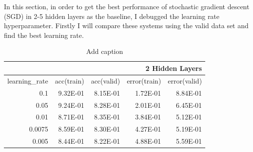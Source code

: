 \documentclass{article}
\begin{document}
In this section, in order to get the best performance of stochastic gradient descent (SGD) in 2-5 hidden layers as the baseline, I debugged the learning rate hyperparameter. Firstly I will compare these systems using the valid data set and find the best learning rate.
\begin{table}[htbp]
  \centering
  \caption{Add caption}
    \begin{tabular}{|r|r|r|r|r|}
    \toprule
    \multicolumn{5}{|p{25em}|}{2 Hidden Layers} \\
    \midrule
    \multicolumn{1}{|r|}{\multirow{2}[2]{*}{learning\_rate}} & \multicolumn{1}{r|}{\multirow{2}[2]{*}{acc(train)}} & \multicolumn{1}{r|}{\multirow{2}[2]{*}{acc(valid)}} & \multicolumn{1}{r|}{\multirow{2}[2]{*}{error(train)}} & \multicolumn{1}{r|}{\multirow{2}[2]{*}{error(valid)}} \\
          &       &       &       &  \\
    \midrule
    \multirow{2}[2]{*}{0.1} & \multirow{2}[2]{*}{9.32E-01} & \multirow{2}[2]{*}{8.15E-01} & \multirow{2}[2]{*}{1.72E-01} & \multirow{2}[2]{*}{8.84E-01} \\
          &       &       &       &  \\
    \midrule
    \multirow{2}[2]{*}{0.05} & \multirow{2}[2]{*}{9.24E-01} & \multirow{2}[2]{*}{8.28E-01} & \multirow{2}[2]{*}{2.01E-01} & \multirow{2}[2]{*}{6.45E-01} \\
          &       &       &       &  \\
    \midrule
    \multirow{2}[2]{*}{0.01} & \multirow{2}[2]{*}{8.71E-01} & \multirow{2}[2]{*}{8.35E-01} & \multirow{2}[2]{*}{3.84E-01} & \multirow{2}[2]{*}{5.12E-01} \\
          &       &       &       &  \\
    \midrule
    \multirow{2}[2]{*}{0.0075} & \multirow{2}[2]{*}{8.59E-01} & \multirow{2}[2]{*}{8.30E-01} & \multirow{2}[2]{*}{4.27E-01} & \multirow{2}[2]{*}{5.19E-01} \\
          &       &       &       &  \\
    \midrule
    \multirow{2}[2]{*}{0.005} & \multirow{2}[2]{*}{8.44E-01} & \multirow{2}[2]{*}{8.22E-01} & \multirow{2}[2]{*}{4.88E-01} & \multirow{2}[2]{*}{5.59E-01} \\
          &       &       &       &  \\
    \bottomrule
    \end{tabular}%
  \label{tab:addlabel}%
\end{table}%
\end{document}
